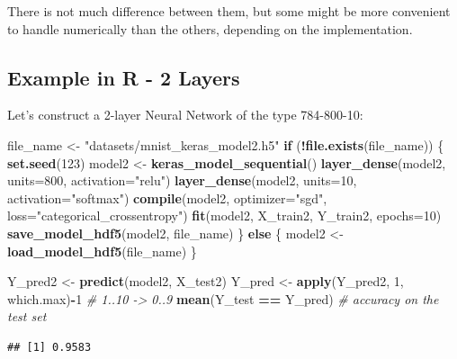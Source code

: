 \documentclass[10pt,b5paper,krantz1]{krantz}
\newenvironment{Shaded}{\begin{snugshade}}{\end{snugshade}}
\newcommand{\CommentTok}[1]{\textcolor[rgb]{0.37,0.37,0.37}{\textit{#1}}}
\newcommand{\ControlFlowTok}[1]{\textcolor[rgb]{0.27,0.27,0.27}{\textbf{#1}}}
\newcommand{\DataTypeTok}[1]{\textcolor[rgb]{0.27,0.27,0.27}{#1}}
\newcommand{\DecValTok}[1]{\textcolor[rgb]{0.06,0.06,0.06}{#1}}
\newcommand{\KeywordTok}[1]{\textcolor[rgb]{0.27,0.27,0.27}{\textbf{#1}}}
\newcommand{\NormalTok}[1]{#1}
\newcommand{\OperatorTok}[1]{\textcolor[rgb]{0.43,0.43,0.43}{\textbf{#1}}}
\newcommand{\StringTok}[1]{\textcolor[rgb]{0.5,0.5,0.5}{#1}}
\begin{document}
There is not much difference between them, but some might be more convenient
to handle numerically than the others, depending on the implementation.

\hypertarget{example-in-r---2-layers}{%
\subsection{Example in R - 2 Layers}\label{example-in-r---2-layers}}

Let's construct a 2-layer Neural Network of the type 784-800-10:

\begin{Shaded}
\begin{Highlighting}[]
\NormalTok{file_name <-}\StringTok{ "datasets/mnist_keras_model2.h5"}
\ControlFlowTok{if}\NormalTok{ (}\OperatorTok{!}\KeywordTok{file.exists}\NormalTok{(file_name)) \{}
    \KeywordTok{set.seed}\NormalTok{(}\DecValTok{123}\NormalTok{)}
\NormalTok{    model2 <-}\StringTok{ }\KeywordTok{keras_model_sequential}\NormalTok{()}
    \KeywordTok{layer_dense}\NormalTok{(model2, }\DataTypeTok{units=}\DecValTok{800}\NormalTok{, }\DataTypeTok{activation=}\StringTok{"relu"}\NormalTok{)}
    \KeywordTok{layer_dense}\NormalTok{(model2, }\DataTypeTok{units=}\DecValTok{10}\NormalTok{,  }\DataTypeTok{activation=}\StringTok{"softmax"}\NormalTok{)}
    \KeywordTok{compile}\NormalTok{(model2, }\DataTypeTok{optimizer=}\StringTok{"sgd"}\NormalTok{,}
            \DataTypeTok{loss=}\StringTok{"categorical_crossentropy"}\NormalTok{)}
    \KeywordTok{fit}\NormalTok{(model2, X_train2, Y_train2, }\DataTypeTok{epochs=}\DecValTok{10}\NormalTok{)}
    \KeywordTok{save_model_hdf5}\NormalTok{(model2, file_name)}
\NormalTok{\} }\ControlFlowTok{else}\NormalTok{ \{}
\NormalTok{    model2 <-}\StringTok{ }\KeywordTok{load_model_hdf5}\NormalTok{(file_name)}
\NormalTok{\}}

\NormalTok{Y_pred2 <-}\StringTok{ }\KeywordTok{predict}\NormalTok{(model2, X_test2)}
\NormalTok{Y_pred <-}\StringTok{ }\KeywordTok{apply}\NormalTok{(Y_pred2, }\DecValTok{1}\NormalTok{, which.max)}\OperatorTok{-}\DecValTok{1} \CommentTok{# 1..10 -> 0..9}
\KeywordTok{mean}\NormalTok{(Y_test }\OperatorTok{==}\StringTok{ }\NormalTok{Y_pred) }\CommentTok{# accuracy on the test set}
\end{Highlighting}
\end{Shaded}

\begin{verbatim}
## [1] 0.9583
\end{verbatim}
\end{document}
